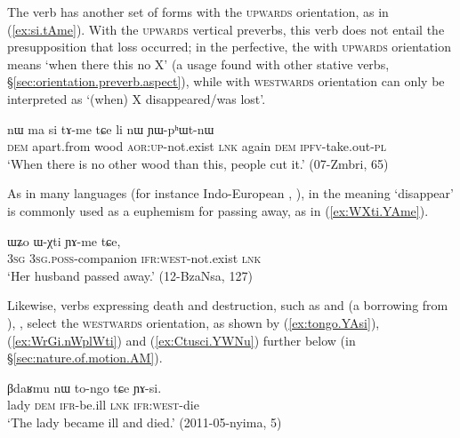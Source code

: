 The verb  has another set of forms with the \textsc{upwards} orientation, as in (\ref{ex:si.tAme}). With the \textsc{upwards} vertical preverbs, this verb does not entail the presupposition that loss occurred; in the perfective, the  with \textsc{upwards} orientation means `when there this no X' (a usage found with other stative verbs, §\ref{sec:orientation.preverb.aspect}), while  with \textsc{westwards} orientation can only be interpreted as `(when) X disappeared/was lost'.

 \begin{exe}
\ex \label{ex:si.tAme}
\gll  nɯ ma si tɤ-me tɕe li nɯ ɲɯ-pʰɯt-nɯ\\
\textsc{dem} apart.from wood \textsc{aor}:\textsc{up}-not.exist \textsc{lnk} again \textsc{dem} \textsc{ipfv}-take.out-\textsc{pl}\\
\glt `When there is no other wood than this, people cut it.' (07-Zmbri, 65)
\end{exe} 

As in many languages (for instance Indo-European , \citealt[439--440]{liv}),  in the meaning `disappear' is commonly used as a euphemism for passing away, as in (\ref{ex:WXti.YAme}).

 \begin{exe}
\ex \label{ex:WXti.YAme}
\gll  ɯʑo ɯ-χti ɲɤ-me tɕe,  \\
\textsc{3sg} \textsc{3sg}.\textsc{poss}-companion \textsc{ifr}:\textsc{west}-not.exist \textsc{lnk} \\
\glt `Her husband passed away.' (12-BzaNsa, 127)
\end{exe} 

Likewise, verbs expressing death and destruction, such as  and  (a borrowing from ), ,  select the \textsc{westwards} orientation, as shown by (\ref{ex:tongo.YAsi}), (\ref{ex:WrGi.nWplWti}) and (\ref{ex:Ctusci.YWNu}) further below (in §\ref{sec:nature.of.motion.AM}).

 \begin{exe}
\ex \label{ex:tongo.YAsi}
\gll βdaʁmu nɯ to-ngo tɕe ɲɤ-si. \\
lady \textsc{dem} \textsc{ifr}-be.ill \textsc{lnk} \textsc{ifr}:\textsc{west}-die \\
\glt `The lady became ill and died.' (2011-05-nyima, 5)
 \end{exe} 
 
